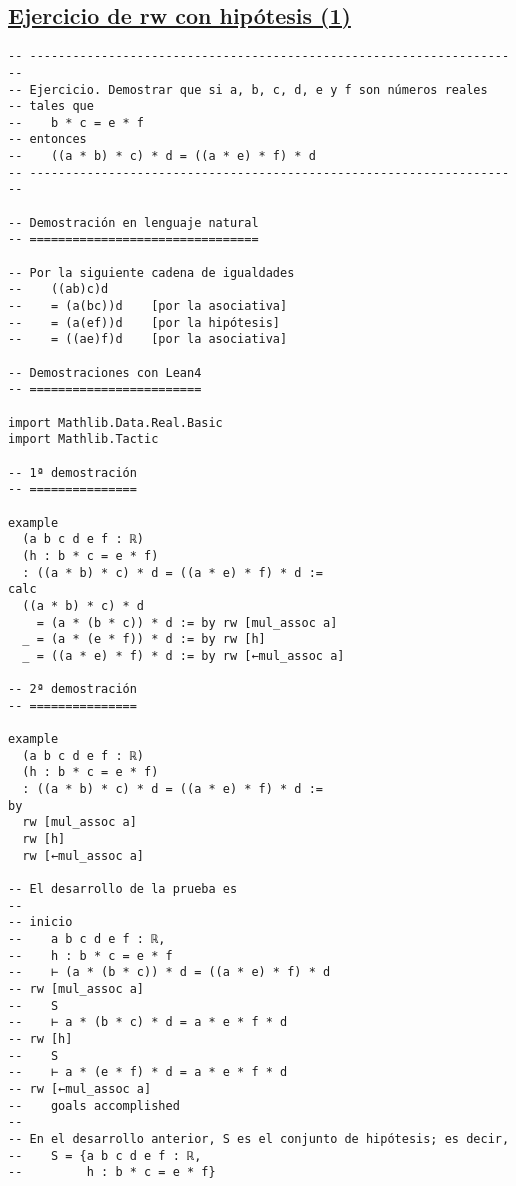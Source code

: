 \subsection{\href{./src/Basicos/Ejercicio\_de\_rw\_sobre\_hipotesis\_1.lean}{Ejercicio de rw con hipótesis (1)}}
\label{sec:orgbd8c341}
\begin{verbatim}
-- ---------------------------------------------------------------------
-- Ejercicio. Demostrar que si a, b, c, d, e y f son números reales
-- tales que
--    b * c = e * f
-- entonces
--    ((a * b) * c) * d = ((a * e) * f) * d
-- ---------------------------------------------------------------------

-- Demostración en lenguaje natural
-- ================================

-- Por la siguiente cadena de igualdades
--    ((ab)c)d
--    = (a(bc))d    [por la asociativa]
--    = (a(ef))d    [por la hipótesis]
--    = ((ae)f)d    [por la asociativa]

-- Demostraciones con Lean4
-- ========================

import Mathlib.Data.Real.Basic
import Mathlib.Tactic

-- 1ª demostración
-- ===============

example
  (a b c d e f : ℝ)
  (h : b * c = e * f)
  : ((a * b) * c) * d = ((a * e) * f) * d :=
calc
  ((a * b) * c) * d
    = (a * (b * c)) * d := by rw [mul_assoc a]
  _ = (a * (e * f)) * d := by rw [h]
  _ = ((a * e) * f) * d := by rw [←mul_assoc a]

-- 2ª demostración
-- ===============

example
  (a b c d e f : ℝ)
  (h : b * c = e * f)
  : ((a * b) * c) * d = ((a * e) * f) * d :=
by
  rw [mul_assoc a]
  rw [h]
  rw [←mul_assoc a]

-- El desarrollo de la prueba es
--
-- inicio
--    a b c d e f : ℝ,
--    h : b * c = e * f
--    ⊢ (a * (b * c)) * d = ((a * e) * f) * d
-- rw [mul_assoc a]
--    S
--    ⊢ a * (b * c) * d = a * e * f * d
-- rw [h]
--    S
--    ⊢ a * (e * f) * d = a * e * f * d
-- rw [←mul_assoc a]
--    goals accomplished
--
-- En el desarrollo anterior, S es el conjunto de hipótesis; es decir,
--    S = {a b c d e f : ℝ,
--         h : b * c = e * f}
\end{verbatim}

